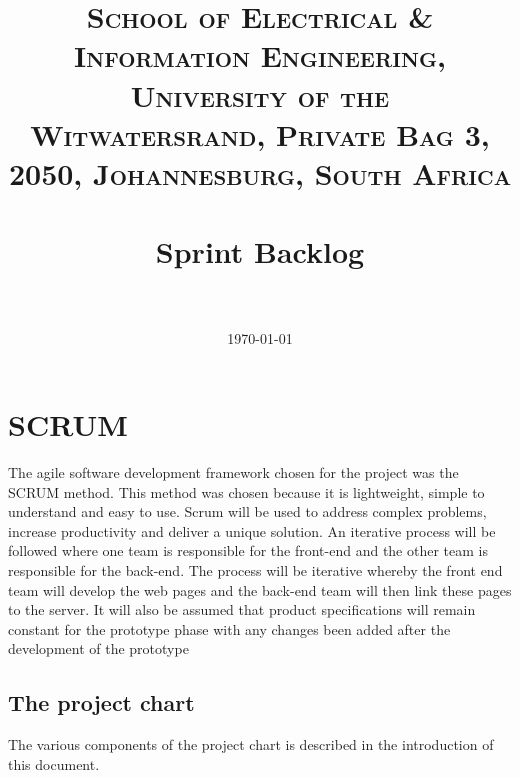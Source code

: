 \documentclass[paper=a4, fontsize=11pt]{scrartcl} %
\title{	
\normalfont \normalsize 
\textsc{School of Electrical \& Information Engineering, University of the
Witwatersrand, Private Bag 3, 2050, Johannesburg, South Africa} \\ [25pt] %
\horrule{0.5pt} \\[0.4cm] %
\huge Sprint Backlog \\ %
\horrule{2pt} \\[0.5cm] %
}
\author{} %
\date{\normalsize\today} %
\numberwithin{equation}{section} %
\numberwithin{figure}{section} %
\numberwithin{table}{section} %
\begin{document}
\maketitle %



\newpage
\section{SCRUM}

The agile software development framework chosen for the project was the SCRUM method. This method was chosen because it is lightweight, simple to understand and easy to use. Scrum will be used to address complex problems, increase productivity and deliver a unique solution. An iterative process will be followed where one team is responsible for the front-end and the other team is responsible for the back-end. The process will be iterative whereby the front end team will develop the web pages and the back-end team will then link these pages to the server. It will also be assumed that product specifications will remain constant for the prototype phase with any changes been added after the development of the prototype

\subsection{The project chart}
The various components of the project chart is described in the introduction of this document.
\end{document}
